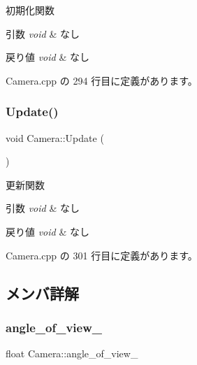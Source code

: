 初期化関数 


\begin{DoxyParams}{引数}
{\em void} & なし \\
\hline
\end{DoxyParams}

\begin{DoxyRetVals}{戻り値}
{\em void} & なし \\
\hline
\end{DoxyRetVals}


 Camera.\+cpp の 294 行目に定義があります。

\mbox{\label{class_camera_a4a596a3ea1fdc7d244ba4268031a360b}} 
\subsubsection{\texorpdfstring{Update()}{Update()}}
{\footnotesize\ttfamily void Camera\+::\+Update (\begin{DoxyParamCaption}{ }\end{DoxyParamCaption})}



更新関数 


\begin{DoxyParams}{引数}
{\em void} & なし \\
\hline
\end{DoxyParams}

\begin{DoxyRetVals}{戻り値}
{\em void} & なし \\
\hline
\end{DoxyRetVals}


 Camera.\+cpp の 301 行目に定義があります。



\subsection{メンバ詳解}
\mbox{\label{class_camera_a76b515411d8c1b2dc0dbbace1b82c0a7}} 
\subsubsection{\texorpdfstring{angle\+\_\+of\+\_\+view\+\_\+}{angle\_of\_view\_}}
{\footnotesize\ttfamily float Camera\+::angle\+\_\+of\+\_\+view\+\_\+\hspace{0.3cm}{\ttfamily [private]}}



